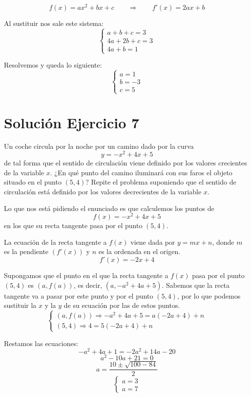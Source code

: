 \documentclass[12pt]{article}
\begin{document}
\[
f(x)=ax^2+bx+c \qquad \Rightarrow \qquad f'(x)=2ax+b
\]

Al sustituir nos sale este sistema:
\[
\begin{cases}
a+b+c=3\\
4a+2b+c=3\\
4a+b=1
\end{cases}
\]

Resolvemos y queda lo siguiente:
\[
\begin{cases}
a=1\\
b=-3\\
c=5
\end{cases}
\]

\section*{Solución Ejercicio 7}
Un coche circula por la noche por un camino dado por la curva
\[
y=-x^2+4x+5
\]
de tal forma que el sentido de circulación viene definido por los valores crecientes de la variable \(x\). ¿En qué punto del camino iluminará con sus faros el objeto situado en el punto \((5,4)\)? Repite el problema suponiendo que el sentido de circulación está definido por los valores decrecientes de la variable \(x\).

Lo que nos está pidiendo el enunciado es que calculemos los puntos de
\[
f(x)=-x^2+4x+5
\]
en los que su recta tangente pasa por el punto \((5,4)\).

La ecuación de la recta tangente a \(f(x)\) viene dada por \(y=mx+n\), donde \(m\)
es la pendiente \((f'(x))\) y \(n\) es la ordenada en el origen.
\[
f'(x)=-2x+4
\]

Supongamos que el punto en el que la recta tangente a \(f(x)\) pasa por el punto
\((5,4)\) es \((a,f(a))\), es decir, \((a,-a^2+4a+5)\). Sabemos que la recta tangente va
a pasar por este punto y por el punto \((5,4)\), por lo que podemos sustituir la \(x\)
y la \(y\) de su ecuación por las de estos puntos.
\[
\begin{cases}
(a,f(a)) \Rightarrow -a^2+4a+5=a(-2a+4)+n\\
(5,4) \Rightarrow 4=5(-2a+4)+n
\end{cases}
\]

Restamos las ecuaciones:
\[
-a^2+4a+1=-2a^2+14a-20
\]
\[
a^2-10a+21=0
\]
\[
a=\frac{10\pm \sqrt{100-84}}{2}
\]
\[
\begin{cases}
a=3\\
a=7
\end{cases}
\]
\end{document}
